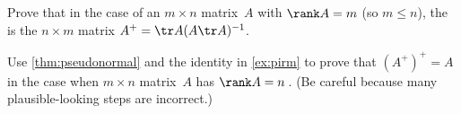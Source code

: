 \begin{exercise} \label{ex:pirm} 
Prove that in the case of an \(m\times n\) matrix~\(A\) with \(\rank A=m\) (so \(m\leq n\)), the  is the \(n\times m\) matrix \(A^+=\tr A(A\tr A)^{-1}\).
\end{exercise}





\begin{exercise}  
Use \cref{thm:pseudonormal} and the identity in \cref{ex:pirm} to prove that \((A^+)^+=A\) in the case when \(m\times n\) matrix~\(A\) has \(\rank A=n\)\,.
(Be careful because many plausible-looking steps are incorrect.)
\end{exercise}




\begin{comment}
More exercises of pseudo-inverse could prove conditionally \((cA)^+=(1/c)A^+\), \((A^+)^+=A\), \((\tr A)^+=\tr{(A^+)}\).
More exercises on function composition.
\end{comment}







